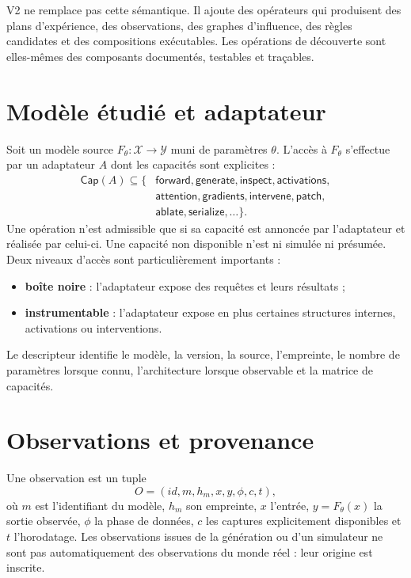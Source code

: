 \documentclass[11pt,a4paper]{article}
\begin{document}
V2 ne remplace pas cette sémantique. Il ajoute des opérateurs qui produisent des plans d'expérience, des observations, des graphes d'influence, des règles candidates et des compositions exécutables. Les opérations de découverte sont elles-mêmes des composants documentés, testables et traçables.

\section{Modèle étudié et adaptateur}
Soit un modèle source $F_\theta : \mathcal{X}\to\mathcal{Y}$ muni de paramètres $\theta$. L'accès à $F_\theta$ s'effectue par un adaptateur $A$ dont les capacités sont explicites :
\[
\begin{aligned}
\mathsf{Cap}(A)\subseteq\{&\textsf{forward},\textsf{generate},\textsf{inspect},\textsf{activations},\\
&\textsf{attention},\textsf{gradients},\textsf{intervene},\textsf{patch},\\
&\textsf{ablate},\textsf{serialize},\ldots\}.
\end{aligned}
\]
Une opération n'est admissible que si sa capacité est annoncée par l'adaptateur et réalisée par celui-ci. Une capacité non disponible n'est ni simulée ni présumée. Deux niveaux d'accès sont particulièrement importants :
\begin{itemize}
\item \textbf{boîte noire} : l'adaptateur expose des requêtes et leurs résultats ;
\item \textbf{instrumentable} : l'adaptateur expose en plus certaines structures internes, activations ou interventions.
\end{itemize}
Le descripteur identifie le modèle, la version, la source, l'empreinte, le nombre de paramètres lorsque connu, l'architecture lorsque observable et la matrice de capacités.

\section{Observations et provenance}
Une observation est un tuple
\[
O=(id,m,h_m,x,y,\phi,c,t),
\]
où $m$ est l'identifiant du modèle, $h_m$ son empreinte, $x$ l'entrée, $y=F_\theta(x)$ la sortie observée, $\phi$ la phase de données, $c$ les captures explicitement disponibles et $t$ l'horodatage. Les observations issues de la génération ou d'un simulateur ne sont pas automatiquement des observations du monde réel : leur origine est inscrite.
\end{document}
